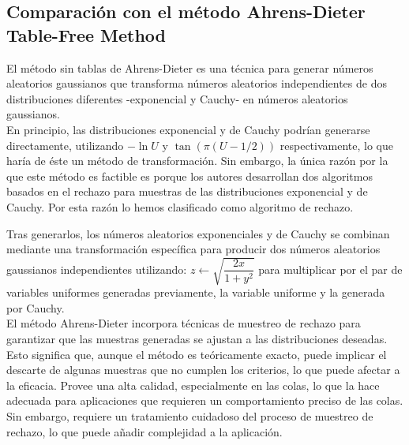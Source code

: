 \subsection{Comparación con el método Ahrens-Dieter Table-Free Method \parencite{Ahrens_TableFree}}

El método sin tablas de Ahrens-Dieter es una técnica para generar números aleatorios gaussianos que transforma números aleatorios independientes de dos distribuciones diferentes -exponencial y Cauchy- en números aleatorios gaussianos. \\

En principio, las distribuciones exponencial y de Cauchy podrían generarse directamente,
utilizando $- \ln U$ y $\tan(\pi (U - 1/2))$ respectivamente, lo que haría de éste un método de transformación. Sin embargo, la única razón por la que este método es factible es porque los autores desarrollan dos algoritmos basados en el rechazo para muestras de las distribuciones exponencial y de Cauchy. Por esta razón lo hemos clasificado como algoritmo de rechazo.

Tras generarlos, los números aleatorios exponenciales y de Cauchy se combinan mediante una transformación específica para producir dos números aleatorios gaussianos independientes utilizando:
$ z \leftarrow \sqrt{\dfrac{2x}{1 + y^2}}$
para multiplicar por el par de variables uniformes generadas previamente, la variable uniforme y la generada por Cauchy.  \\

El método Ahrens-Dieter incorpora técnicas de muestreo de rechazo para garantizar que las muestras generadas se ajustan a las distribuciones deseadas. Esto significa que, aunque el método es teóricamente exacto, puede implicar el descarte de algunas muestras que no cumplen los criterios, lo que puede afectar a la eficacia. Provee una alta calidad, especialmente en las colas, lo que la hace adecuada para aplicaciones que requieren un comportamiento preciso de las colas. Sin embargo, requiere un tratamiento cuidadoso del proceso de muestreo de rechazo, lo que puede añadir complejidad a la aplicación.

